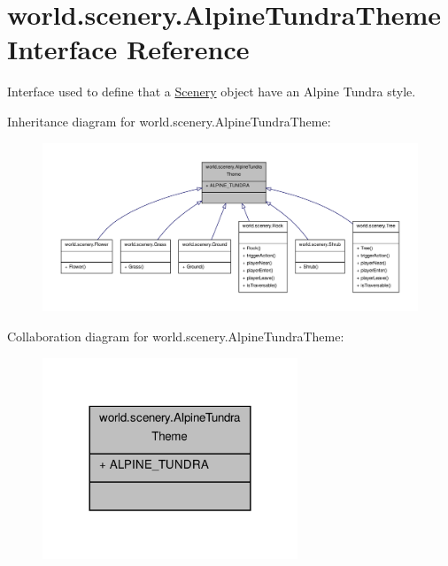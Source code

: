 \hypertarget{interfaceworld_1_1scenery_1_1_alpine_tundra_theme}{\section{world.\-scenery.\-Alpine\-Tundra\-Theme Interface Reference}
\label{interfaceworld_1_1scenery_1_1_alpine_tundra_theme}
}


Interface used to define that a \hyperlink{classworld_1_1scenery_1_1_scenery}{Scenery} object have an Alpine Tundra style.  




Inheritance diagram for world.\-scenery.\-Alpine\-Tundra\-Theme\-:\nopagebreak
\begin{figure}[H]
\begin{center}
\leavevmode
\includegraphics[width=350pt]{interfaceworld_1_1scenery_1_1_alpine_tundra_theme__inherit__graph}
\end{center}
\end{figure}


Collaboration diagram for world.\-scenery.\-Alpine\-Tundra\-Theme\-:\nopagebreak
\begin{figure}[H]
\begin{center}
\leavevmode
\includegraphics[width=216pt]{interfaceworld_1_1scenery_1_1_alpine_tundra_theme__coll__graph}
\end{center}
\end{figure}

